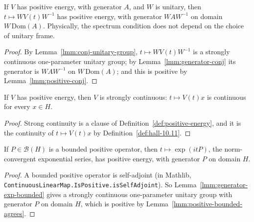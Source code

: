 \begin{lemma}
    \label{lmm:positive-energy-conj}
    \leanok
    If $V$ has positive energy, with generator $A$, and $W$ is unitary, then $t \mapsto WV(t)W^{-1}$ has positive energy, with generator $WAW^{-1}$ on domain $W\,\text{Dom}(A)$. Physically, the spectrum condition does not depend on the choice of unitary frame.
\end{lemma}
\begin{proof}
    \leanok
    By Lemma~\ref{lmm:conj-unitary-group}, $t \mapsto WV(t)W^{-1}$ is a strongly continuous one-parameter unitary group; by Lemma~\ref{lmm:generator-conj} its generator is $WAW^{-1}$ on $W\,\text{Dom}(A)$; and this is positive by Lemma~\ref{lmm:positive-conj}.
\end{proof}

\begin{lemma}
    \label{lmm:positive-energy-strong-continuous}
    \leanok
    If $V$ has positive energy, then $V$ is strongly continuous: $t \mapsto V(t)x$ is continuous for every $x \in H$.
\end{lemma}
\begin{proof}
    \leanok
    Strong continuity is a clause of Definition~\ref{def:positive-energy}, and it is the continuity of $t \mapsto V(t)x$ by Definition~\ref{def:hall-10.11}.
\end{proof}

\begin{lemma}
    \label{lmm:positive-energy-exp-bounded}
    \leanok
    If $P \in \mathcal{B}(H)$ is a bounded positive operator, then $t \mapsto \exp(itP)$, the norm-convergent exponential series, has positive energy, with generator $P$ on domain $H$.
\end{lemma}
\begin{proof}
    \leanok
    A bounded positive operator is self-adjoint (in Mathlib, \texttt{ContinuousLinearMap.IsPositive.isSelfAdjoint}). So Lemma~\ref{lmm:generator-exp-bounded} gives a strongly continuous one-parameter unitary group with generator $P$ on domain $H$, which is positive by Lemma~\ref{lmm:positive-bounded-agrees}.
\end{proof}

